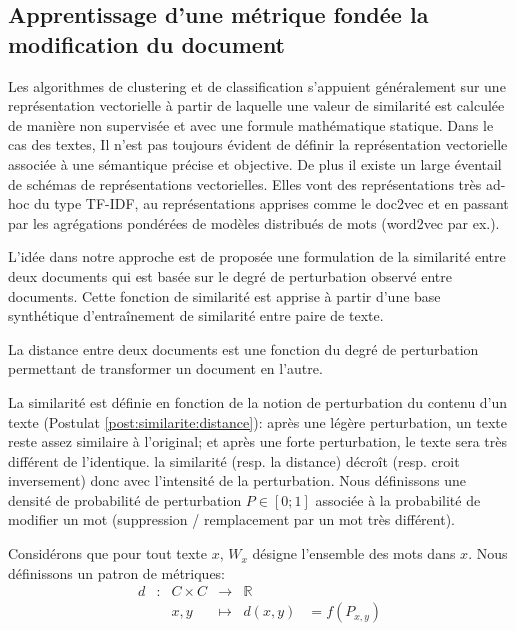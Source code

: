 \subsection{Apprentissage d'une métrique fondée la modification du document}
Les algorithmes de clustering et de classification s'appuient généralement sur une représentation vectorielle à partir de laquelle une valeur de similarité est calculée de manière non supervisée et avec une formule mathématique statique. Dans le cas des textes, Il n'est pas toujours évident de définir la représentation vectorielle associée à une sémantique précise et objective. De plus il existe un large éventail de schémas de représentations vectorielles. Elles vont des représentations très ad-hoc du type TF-IDF, au représentations apprises comme le doc2vec et en passant par les agrégations pondérées de modèles distribués de mots (word2vec par ex.). 

L'idée dans notre approche est de proposée une formulation de la similarité entre deux documents qui est basée sur le degré de perturbation observé entre documents. Cette fonction de similarité est apprise à partir d'une base synthétique d'entraînement de similarité entre paire de texte. 
\begin{postulat}
La distance entre deux documents est une fonction du degré de perturbation permettant de transformer un document en l'autre. \label{post:similarite:distance}
\end{postulat}
La similarité est définie en fonction de la notion de perturbation du contenu d'un texte (Postulat \ref{post:similarite:distance}): après une légère perturbation, un texte reste assez similaire à l'original; et après une forte perturbation, le texte sera très différent de l'identique. la similarité (resp. la distance) décroît (resp. croit inversement) donc avec l'intensité de la perturbation. Nous définissons une densité de probabilité de perturbation $P \in [0; 1]$ associée à la probabilité de modifier un mot (suppression / remplacement par un mot très différent). 

Considérons que pour tout texte $x$, $W_x$ désigne l'ensemble des mots dans $x$.
Nous définissons un patron de métriques:
\begin{equation}
\begin{array}{cccccc}
d & : & C \times C & \to & \mathbb{R} & \\
 & & x, y & \mapsto & d(x, y) & = f(P_{x,y}) \\
\end{array}
\end{equation}

